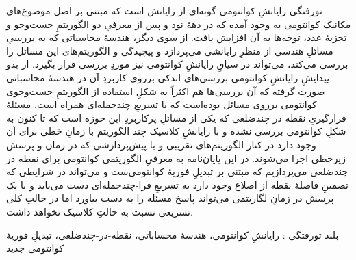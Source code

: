 


\pagestyle{empty}

‌تورفتگی
رایانشِ کوانتومی گونه‌ای از رایانش است که مبتنی بر اصل موضوع‌های مکانیک کوانتومی به وجود آمده 
که در دههٔ نود و پس از معرفیِ دو الگوریتمِ جست‌وجو و تجزیهٔ عدد، توجه‌ها به آن افزایش یافت.
از سوی دیگر، هندسهٔ محاسباتی که به بررسیِ مسائلِ هندسی از منظرِ رایانشی می‌پردازد و پیچیدگی و 
الگوریتم‌های این مسائل را بررسی می‌کند، می‌تواند در سیاقِ رایانشِ کوانتومی نیز موردِ بررسی قرار 
بگیرد. از بدو پیدایشِ رایانشِ کوانتومی بررسی‌های اندکی برروی کاربردِ آن در هندسهٔ محاسباتی صورت
گرفته که آن بررسی‌ها هم اکثراً به شکلِ استفاده از الگوریتمِ جست‌وجوی کوانتومی برروی مسائل بوده‌است
که با تسریعِ چندجمله‌ای همراه است. مسئلهٔ قرارگیریِ نقطه در چندضلعی که یکی از مسائلِ پرکاربردِ این حوزه
است که تا کنون به شکلِ کوانتومی بررسی نشده و با رایانشِ کلاسیک چند الگوریتم با زمانِ خطی برای آن
وجود دارد در کنار الگوریتم‌های تقریبی و با پیش‌پردازشی که در زمان و پرسش زیرخطی اجرا می‌شوند.
در این پایان‌نامه به معرفیِ الگوریتمی کوانتومی برای نقطه در چندضلعی می‌پردازیم که مبتنی بر تبدیلِ
فوریهٔ کوانتومی‌ست و می‌تواند در  شرایطی که تضمینِ فاصلهٔ نقطه از اضلاع وجود دارد به تسریعِ
فرا-چندجمله‌ای دست می‌یابد و با یک پرسش در زمانِ لگاریتمی می‌تواند پاسخ مسئله را به دست بیاورد
اما در حالتِ کلی تسریعی نسبت به حالتِ کلاسیک نخواهد داشت.

‌بلند
‌تورفتگی : 
رایانشِ کوانتومی، هندسهٔ محساباتی، نقطه-در-چندضلعی، تبدیلِ فوریهٔ کوانتومی
‌جدید
